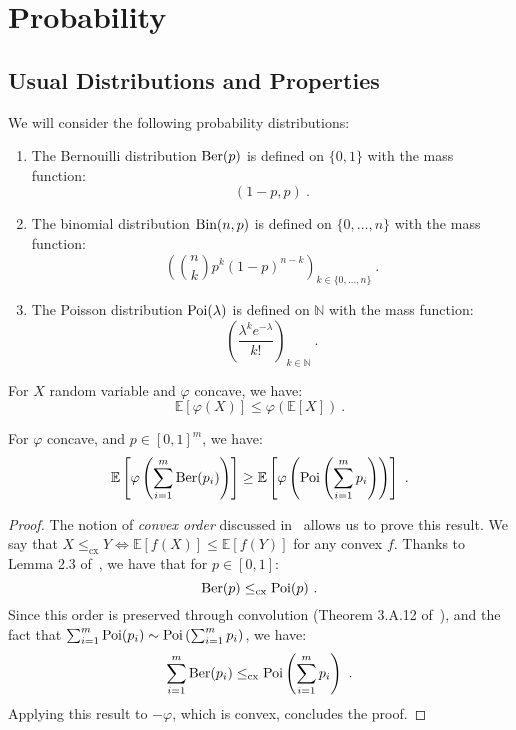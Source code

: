 \section{Probability}
\subsection{Usual Distributions and Properties}
\begin{definition}
  We will consider the following probability distributions:
  \begin{enumerate}
  \item The Bernouilli distribution $\operatorname{\text{Ber}}(p)$ is defined on $\{0,1\}$ with the mass function:
        \[ (1-p,p) \ . \]
  \item The binomial distribution $\operatorname{\text{Bin}}(n,p)$ is defined on $\{0,\ldots,n\}$ with the mass function:
        \[ \left(\binom{n}{k}p^k(1-p)^{n-k}\right)_{k \in \{0,\ldots,n\}} \ .\]
  \item The Poisson distribution $\operatorname{\text{Poi}}(\lambda)$ is defined on $\mathbb{N}$ with the mass function:
        \[ \left(\frac{\lambda^ke^{-\lambda}}{k!}\right)_{k \in \mathbb{N}} \ .\]
  \end{enumerate}      
\end{definition}

\begin{proposition}
   For $X$ random variable and $\varphi$ concave, we have:
   \[ \mathbb{E}\left[\varphi(X)\right] \leq \varphi\left(\mathbb{E}[X]\right) \ . \]
\end{proposition}

\begin{proposition}
    For $\varphi$ concave, and $p \in [0,1]^m$, we have:
    \[\mathbb{E}\left[\varphi\left(\sum_{i=1}^m\operatorname{\text{Ber}}(p_i)\right)\right] \geq \mathbb{E}\left[\varphi\left(\operatorname{\text{Poi}}\left(\sum_{i=1}^m p_i\right)\right)\right]\ .\]
  \label{prop:ConvexOrder}
\end{proposition}

\begin{proof}
  The notion of \emph{convex order} discussed in~\cite{SS07} allows us to prove this result. We say that $X \leq_{\text{cx}} Y \iff \mathbb{E}[f(X)] \leq \mathbb{E}[f(Y)]$ for any convex $f$. Thanks to Lemma 2.3 of~\cite{BFGG20}, we have that for $p \in [0,1]$:
  \[\Ber(p) \leq_{\text{cx}} \Poi(p)\ .\]
  Since this order is preserved through convolution (Theorem 3.A.12 of~\cite{SS07}), and the fact that $\sum_{i=1}^m \operatorname{\text{Poi}}(p_i) \sim \operatorname{\text{Poi}}\left(\sum_{i=1}^m p_i\right)$, we have:
  \[\sum_{i=1}^m\operatorname{\text{Ber}}(p_i) \leq_{\text{cx}}  \operatorname{\text{Poi}}\left(\sum_{i=1}^m p_i\right)\ .\]
  Applying this result to $-\varphi$, which is convex, concludes the proof.
\end{proof}

